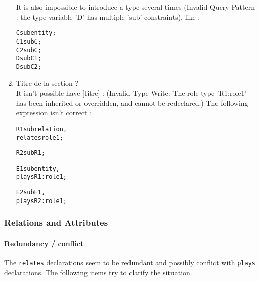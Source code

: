 \documentclass[runningheads]{llncs}
\begin{document}
\begin{enumerate}
It is also impossible to introduce a type several times (Invalid Query Pattern : the type variable 'D' has multiple 'sub' constraints), like :

  \begin{alltt}
    C sub entity;
    C1 sub C;
    C2 sub C;
    D sub C1;
    D sub C2;
  \end{alltt}


\item Titre de la section ?\\
It isn't possible have [titre] : (Invalid Type Write: The role type 'R1:role1' has been inherited or overridden, and cannot be redeclared.) The following expression isn't correct :

\begin{alltt}
     R1 sub relation,
     relates role1;
    
     R2 sub R1;
      
    E1 sub entity,
    plays R1:role1;
    
    E2 sub E1,
    plays R2:role1;
  \end{alltt}

\end{enumerate}


\subsubsection{Relations and Attributes}



\paragraph{Redundancy / conflict} The \texttt{relates} declarations seem to be redundant and possibly conflict with \texttt{plays} declarations. The following items try to clarify the situation.
\end{document}
